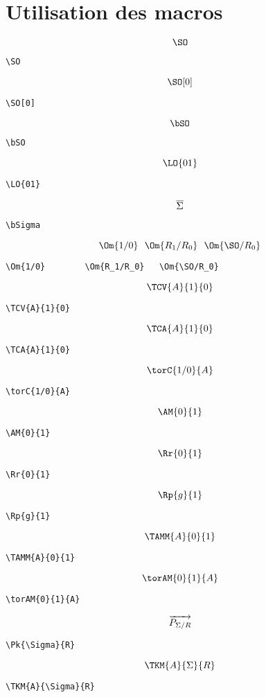 \documentclass[a4paper,9pt]{article}
\begin{document}
\section{Utilisation des macros}                                                         
$$\SO$$
\begin{verbatim}
\SO
\end{verbatim}
$$\SO[0]$$
\begin{verbatim}
\SO[0]
\end{verbatim}
$$\bSO$$
\begin{verbatim}
\bSO
\end{verbatim}
$$\LO{01}$$
\begin{verbatim}
\LO{01}
\end{verbatim}
$$\overline{\Sigma}$$
\begin{verbatim}
\bSigma
\end{verbatim}
$$\Om{1/0}\,\,\,\,\Om{R_1/R_0}\,\,\,\,\Om{\SO/R_0}$$
\begin{verbatim}
\Om{1/0}        \Om{R_1/R_0}   \Om{\SO/R_0}
\end{verbatim}
$$\TCV{A}{1}{0}$$
\begin{verbatim}
\TCV{A}{1}{0}
\end{verbatim}
$$\TCA{A}{1}{0}$$
\begin{verbatim}
\TCA{A}{1}{0}
\end{verbatim}
$$\torC{1/0}{A}$$
\begin{verbatim}
\torC{1/0}{A}
\end{verbatim}
$$\AM{0}{1}$$
\begin{verbatim}
\AM{0}{1}
\end{verbatim}
$$\Rr{0}{1}$$
\begin{verbatim}
\Rr{0}{1}
\end{verbatim}
$$\Rp{g}{1}$$
\begin{verbatim}
\Rp{g}{1}
\end{verbatim}
$$\TAMM{A}{0}{1}$$
\begin{verbatim}
\TAMM{A}{0}{1}
\end{verbatim}
$$\torAM{0}{1}{A}$$
\begin{verbatim}
\torAM{0}{1}{A}
\end{verbatim}
$$\overrightarrow{P_{\Sigma/R}}$$
\begin{verbatim}
\Pk{\Sigma}{R}
\end{verbatim}
$$\TKM{A}{\Sigma}{R}$$
\begin{verbatim}
\TKM{A}{\Sigma}{R}
\end{verbatim}
\end{document}
